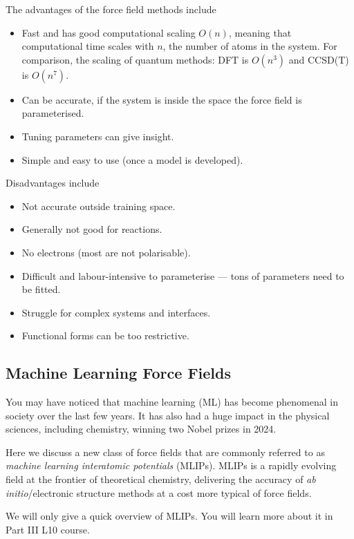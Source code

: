 \documentclass{article}
\theoremstyle{plain}\theoremheaderfont{\normalfont\itshape}\theorembodyfont{\rmfamily}\theoremseparator{.}\newtheorem*{rem}{Remark}\newtheorem*{ex}{Example}\newtheorem*{proof}{Proof}\newtheorem*{altp}{Alternative proof}
\theoremstyle{plain}\theoremheaderfont{\normalfont\bfseries}\theorembodyfont{\rmfamily}\theoremseparator{.}\newtheorem{thm}{Theorem}[section]\newtheorem{lem}[thm]{Lemma}\newtheorem{prop}[thm]{Proposition}\newtheorem*{cor}{Corollary}\newtheorem{defn}[thm]{Definition}\newtheorem{clm}[thm]{Claim}\newtheorem{clminproof}{Claim}\newtheorem{pos}{Postulate}[section]
\theoremstyle{break}\theoremheaderfont{\normalfont\itshape}\theorembodyfont{\rmfamily}\theoremseparator{.\medskip}\newtheorem*{proofskip}{Proof}\newtheorem*{exs}{Examples}\newtheorem*{rems}{Remarks}
\theoremstyle{break}\theoremheaderfont{\normalfont\bfseries}\theorembodyfont{\rmfamily}\theoremseparator{.\medskip}\newtheorem{lemskip}[thm]{Lemma}\newtheorem{defnskip}[thm]{Definition}\newtheorem{propskip}[thm]{Proposition}\newtheorem{thmskip}[thm]{Theorem}
\numberwithin{equation}{section}
\begin{document}
    The advantages of the force field methods include
    \begin{itemize}[topsep=0pt]
        \item Fast and has good computational scaling \(O(n)\), meaning that computational time scales with \(n\), the number of atoms in the system. For comparison, the scaling of quantum methods: DFT is \(O(n^3)\) and CCSD(T) is \(O(n^7)\).
        \item Can be accurate, if the system is inside the space the force field is parameterised.
        \item Tuning parameters can give insight.
        \item Simple and easy to use (once a model is developed).
    \end{itemize}
    Disadvantages include
    \begin{itemize}[topsep=0pt]
        \item Not accurate outside training space.
        \item Generally not good for reactions.
        \item No electrons (most are not
        polarisable).
        \item Difficult and labour-intensive to parameterise --- tons of parameters need to be fitted.
        \item Struggle for complex systems and interfaces.
        \item Functional forms can be too restrictive.
    \end{itemize}

    \subsection{Machine Learning Force Fields}
    You may have noticed that machine learning (ML) has become phenomenal in society over the last few years. It has also had a huge impact in the physical sciences, including chemistry, winning two Nobel prizes in 2024.

    Here we discuss a new class of force fields that are commonly referred to as \textit{machine learning interatomic potentials} (MLIPs). MLIPs is a rapidly evolving field at the frontier of theoretical chemistry, delivering the accuracy of \textit{ab initio}/electronic structure methods at a cost more typical of force fields.

    We will only give a quick overview of MLIPs. You will learn more about it in Part III L10 course.
\end{document}
